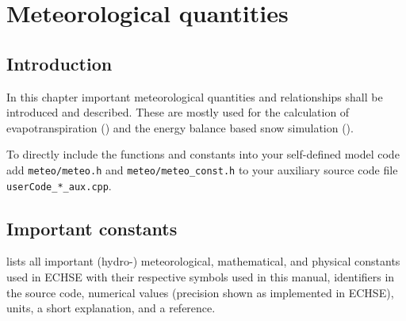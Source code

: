 \chapter{Meteorological quantities} \label{chap:meteo}
\renewcommand{\tabdir}{chapters/part_processes/meteo/tab}
\renewcommand{\figdir}{chapters/part_processes/meteo/fig}



\section{Introduction} \label{sec:meteo:intro}

In this chapter important meteorological quantities and relationships shall be introduced and described. These are mostly used for the calculation of evapotranspiration () and the energy balance based snow simulation ().

To directly include the functions and constants into your self-defined model code add \verb!meteo/meteo.h! and \verb!meteo/meteo_const.h! to your auxiliary source code file \verb!userCode_*_aux.cpp!.


\section{Important constants} \label{sec:meteo:constants}
 lists all important (hydro-) meteorological, mathematical, and physical constants used in ECHSE with their respective symbols used in this manual, identifiers in the source code, numerical values (precision shown as implemented in ECHSE), units, a short explanation, and a reference.

